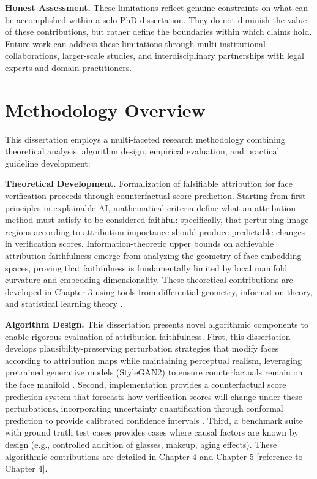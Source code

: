 \textbf{Honest Assessment.} These limitations reflect genuine constraints on what can be accomplished within a solo PhD dissertation. They do not diminish the value of these contributions, but rather define the boundaries within which claims hold. Future work can address these limitations through multi-institutional collaborations, larger-scale studies, and interdisciplinary partnerships with legal experts and domain practitioners.

\section{Methodology Overview}
\label{sec:methodology}

This dissertation employs a multi-faceted research methodology combining theoretical analysis, algorithm design, empirical evaluation, and practical guideline development:

\textbf{Theoretical Development.} Formalization of falsifiable attribution for face verification proceeds through counterfactual score prediction. Starting from first principles in explainable AI, mathematical criteria define what an attribution method must satisfy to be considered faithful: specifically, that perturbing image regions according to attribution importance should produce predictable changes in verification scores. Information-theoretic upper bounds on achievable attribution faithfulness emerge from analyzing the geometry of face embedding spaces, proving that faithfulness is fundamentally limited by local manifold curvature and embedding dimensionality. These theoretical contributions are developed in Chapter 3 using tools from differential geometry, information theory, and statistical learning theory \cite{cover2006information,bengio2013manifold}.

\textbf{Algorithm Design.} This dissertation presents novel algorithmic components to enable rigorous evaluation of attribution faithfulness. First, this dissertation develops plausibility-preserving perturbation strategies that modify faces according to attribution maps while maintaining perceptual realism, leveraging pretrained generative models (StyleGAN2) to ensure counterfactuals remain on the face manifold \cite{karras2020stylegan2}. Second, implementation provides a counterfactual score prediction system that forecasts how verification scores will change under these perturbations, incorporating uncertainty quantification through conformal prediction to provide calibrated confidence intervals \cite{shafer2008conformal,angelopoulos2021conformal}. Third, a benchmark suite with ground truth test cases provides cases where causal factors are known by design (e.g., controlled addition of glasses, makeup, aging effects). These algorithmic contributions are detailed in Chapter 4 and Chapter 5 [reference to Chapter 4].

